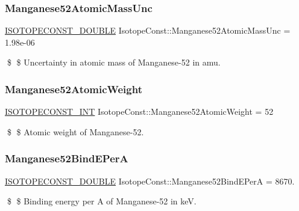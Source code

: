 \subsubsection{\texorpdfstring{Manganese52\+Atomic\+Mass\+Unc}{Manganese52AtomicMassUnc}}
{\footnotesize\ttfamily \mbox{\hyperlink{group___isotope_const-_macros_ga8f45a7272ce02c0b4c65c44636ed719a}{I\+S\+O\+T\+O\+P\+E\+C\+O\+N\+S\+T\+\_\+\+D\+O\+U\+B\+LE}} Isotope\+Const\+::\+Manganese52\+Atomic\+Mass\+Unc = 1.\+98e-\/06}

\$ \$ Uncertainty in atomic mass of Manganese-\/52 in amu. \mbox{\label{group___isotope_const-_manganese-_mn52_ga1a76f78f9114ff2bddeec8eb70148477}} 
\subsubsection{\texorpdfstring{Manganese52\+Atomic\+Weight}{Manganese52AtomicWeight}}
{\footnotesize\ttfamily \mbox{\hyperlink{group___isotope_const-_macros_ga5f18360b3e99483a35c32d789e62621c}{I\+S\+O\+T\+O\+P\+E\+C\+O\+N\+S\+T\+\_\+\+I\+NT}} Isotope\+Const\+::\+Manganese52\+Atomic\+Weight = 52}

\$ \$ Atomic weight of Manganese-\/52. \mbox{\label{group___isotope_const-_manganese-_mn52_ga28895f9923fd8b0c6c85eac50f1c2574}} 
\subsubsection{\texorpdfstring{Manganese52\+Bind\+E\+PerA}{Manganese52BindEPerA}}
{\footnotesize\ttfamily \mbox{\hyperlink{group___isotope_const-_macros_ga8f45a7272ce02c0b4c65c44636ed719a}{I\+S\+O\+T\+O\+P\+E\+C\+O\+N\+S\+T\+\_\+\+D\+O\+U\+B\+LE}} Isotope\+Const\+::\+Manganese52\+Bind\+E\+PerA = 8670.}

\$ \$ Binding energy per A of Manganese-\/52 in keV. \mbox{\label{group___isotope_const-_manganese-_mn52_gaff36b4ccfcb65ae4e87bdde4eac4310a}} 
